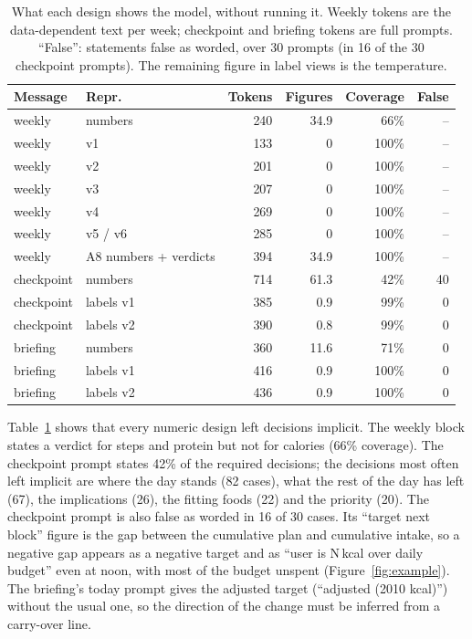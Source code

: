 \documentclass[10pt,twocolumn]{article}
\begin{document}
\begin{table}[t]
\centering\small
\setlength{\tabcolsep}{3.5pt}
\begin{tabular}{@{}llrrrr@{}}
\toprule
Message & Repr. & Tokens & Figures & Coverage & False\\
\midrule
weekly & numbers & 240 & 34.9 & 66\% & --\\
weekly & v1 & 133 & 0 & 100\% & --\\
weekly & v2 & 201 & 0 & 100\% & --\\
weekly & v3 & 207 & 0 & 100\% & --\\
weekly & v4 & 269 & 0 & 100\% & --\\
weekly & v5 / v6 & 285 & 0 & 100\% & --\\
weekly & A8 numbers + verdicts & 394 & 34.9 & 100\% & --\\
\midrule
checkpoint & numbers & 714 & 61.3 & 42\% & 40\\
checkpoint & labels v1 & 385 & 0.9 & 99\% & 0\\
checkpoint & labels v2 & 390 & 0.8 & 99\% & 0\\
\midrule
briefing & numbers & 360 & 11.6 & 71\% & 0\\
briefing & labels v1 & 416 & 0.9 & 100\% & 0\\
briefing & labels v2 & 436 & 0.9 & 100\% & 0\\
\bottomrule
\end{tabular}
\caption{What each design shows the model, without running it. Weekly tokens are the data-dependent text per week;
checkpoint and briefing tokens are full prompts. ``False'': statements false as worded, over 30 prompts (in 16 of the
30 checkpoint prompts). The remaining figure in label views is the temperature.}
\label{tab:rep}
\end{table}

Table~\ref{tab:rep} shows that every numeric design left decisions implicit. The weekly block states a verdict for
steps and protein but not for calories (66\% coverage). The checkpoint prompt states 42\% of the required decisions;
the decisions most often left implicit are where the day stands (82 cases), what the rest of the day has left (67),
the implications (26), the fitting foods (22) and the priority (20). The checkpoint prompt is also false as worded in
16 of 30 cases. Its ``target next block'' figure is the gap between the cumulative plan and cumulative intake, so a
negative gap appears as a negative target and as ``user is N\,kcal over daily budget'' even at noon, with most of the
budget unspent (Figure~\ref{fig:example}). The briefing's today prompt gives the adjusted target (``adjusted (2010
kcal)'') without the usual one, so the direction of the change must be inferred from a carry-over line.
\end{document}
